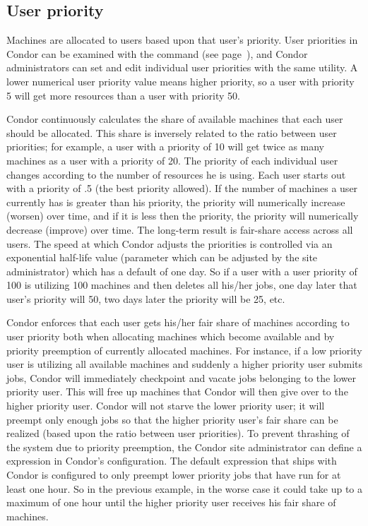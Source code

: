 \subsection{\label{sec:user-priority-explained}User priority}

Machines are allocated to users based upon that user's priority. User
priorities in Condor can be examined with the 
command (see page~\pageref{man-condor-userprio}),
and Condor administrators can set and edit individual user priorities
with the same utility. A lower numerical user priority value means
higher priority, so a user with priority 5 will get more resources than
a user with priority 50.  

Condor continuously calculates the share of available machines that each
user should be allocated.    This share is inversely related to the ratio
between user priorities; for example, a user with a priority of 10 will
get twice as many machines as a user with a priority of 20. The priority
of each individual user changes according to the number of resources he
is using. Each user starts out with a priority of .5 (the best
priority allowed).  If the number of machines a user currently has is greater than his
priority, the priority will numerically increase (worsen) over time, and if it is less then
the priority, the priority will numerically decrease (improve) over time. 
The long-term result is fair-share access across all users.  The speed
at which Condor adjusts the priorities is controlled via an exponential
half-life value (parameter  which can be adjusted
by the site administrator) which has a
default of one day.  So if a user with a user priority of 100 is
utilizing 100 machines and then deletes all his/her jobs, one day later that user's
priority will  50, two days later the priority will be 25, etc. 

Condor enforces that each user gets his/her fair share of machines
according to user priority both when allocating machines which become
available and by priority preemption of currently allocated machines.
For instance, if a low priority user is utilizing all available machines
and suddenly a higher priority user submits jobs, Condor will
immediately checkpoint and vacate jobs belonging to the lower priority
user. This will free up machines that Condor will then give over to the
higher priority user. Condor will not starve the lower priority user; it
will preempt only enough jobs so that the higher priority user's fair
share can be realized (based upon the ratio between user priorities). To
prevent thrashing of the system due to priority preemption, the Condor 
site administrator can define a  expression in Condor's configuration.
The default expression that ships with Condor is configured to only preempt 
lower priority jobs that have run
for at least one hour. So in the previous example, in the worse case it
could take up to a maximum of one hour until the higher priority user
receives his fair share of machines. 

